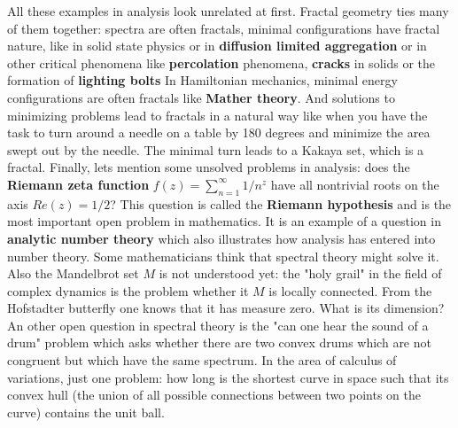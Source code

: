 \documentclass[12pt]{amsart}
\def\chapter#1{ \vspace{2mm} \begin{center} \fcolorbox{green1}{green1}{ \parbox{16.2cm}{{\Large {\bf #1}}}} \vspace{2mm} \end{center} }
\newcounter{example}    \def\example#1{ \item \fontsize{12}{15} \selectfont #1 \fontsize{12}{15} \selectfont }
\begin{document}
All these examples in analysis look unrelated at first. 
Fractal geometry ties many of them together: spectra are often fractals, 
minimal configurations have fractal nature, like in solid state physics or in {\bf diffusion limited aggregation}
or in other critical phenomena like {\bf percolation} phenomena, {\bf cracks} in solids or the formation of 
{\bf lighting bolts}
In Hamiltonian mechanics, minimal energy configurations are often fractals like {\bf Mather theory}. And solutions
to minimizing problems lead to fractals in a natural way like when you have the task to turn around a needle 
on a table by 180 degrees and minimize the area swept out by the needle. The minimal turn leads to a Kakaya set, which is
a fractal. Finally, lets mention some unsolved problems in analysis: 
does the {\bf Riemann zeta function} $f(z) = \sum_{n=1}^\infty 1/n^z$ have all nontrivial roots on the axis $Re(z)=1/2$? 
This question is called the {\bf Riemann hypothesis} and is 
the most important open problem in mathematics.  It is an example of a question in {\bf analytic number theory} which
also illustrates how analysis has entered into number theory. Some mathematicians think that spectral theory might solve it.
Also the Mandelbrot set $M$ is not understood yet: the "holy grail" in the field of complex dynamics 
is the problem whether it $M$ is locally connected. From the Hofstadter butterfly one knows that it has measure zero. What is its dimension? 
An other open question in spectral theory is the "can one hear the sound of a drum" problem which asks 
whether there are two convex drums which are not congruent but which 
have the same spectrum. In the area of calculus of variations, just one problem: how long is the shortest curve in space
such that its convex hull (the union of all possible connections between two points on the curve)  contains the unit ball. 


 \pagebreak
{}

\chapter{Lecture 11: Cryptography}
\end{document}
